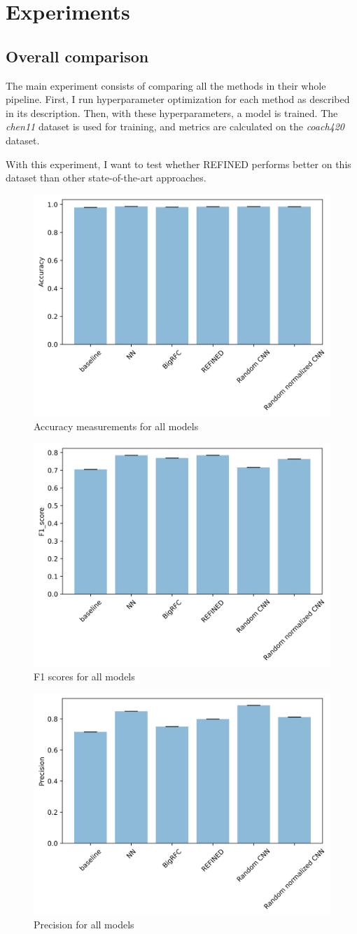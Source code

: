 \chapter{Experiments}

\section{Overall comparison}

The main experiment consists of comparing all the methods in their whole pipeline. First, I run hyperparameter optimization for each method as described in its description. Then, with these hyperparameters, a model is trained. The \textit{chen11} dataset is used for training, and metrics are calculated on the \textit{coach420} dataset.

With this experiment, I want to test whether REFINED performs better on this dataset than other state-of-the-art approaches. 
\begin{figure}
    \centering
    \includegraphics[width=0.5\linewidth]{img/Accuracy.png}
    \caption{Accuracy measurements for all models}
    \label{fig:accuracy}
\end{figure}
\begin{figure}
    \centering
    \includegraphics[width=0.5\linewidth]{F1_score.png}
    \caption{F1 scores for all models}
    \label{fig:f1}
\end{figure}

\begin{figure}
    \centering
    \includegraphics[width=0.5\linewidth]{Precision.png}
    \caption{Precision for all models}
    \label{fig:precision}
\end{figure}

